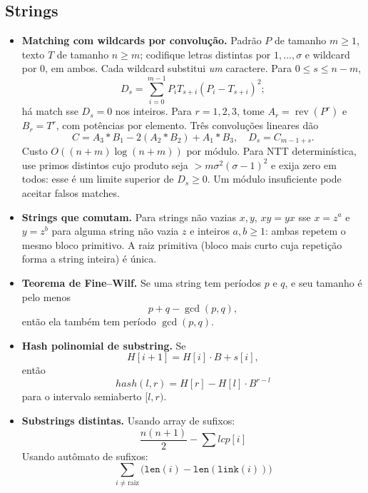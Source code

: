 
\subsection{Strings}
\begin{itemize}[leftmargin=*,label={}]
\item \textbf{Matching com wildcards por convolução.}
Padrão $P$ de tamanho $m\ge1$, texto $T$ de tamanho $n\ge m$; codifique letras distintas por $1,\ldots,\sigma$ e wildcard por 0, em ambos. Cada wildcard substitui \emph{um} caractere. Para $0\le s\le n-m$,
\[
D_s=\sum_{i=0}^{m-1}P_iT_{s+i}(P_i-T_{s+i})^2;
\]
há match sse $D_s=0$ nos inteiros. Para $r=1,2,3$, tome $A_r=\operatorname{rev}(P^r)$ e $B_r=T^r$, com potências por elemento. Três convoluções lineares dão
\[
C=A_3*B_1-2(A_2*B_2)+A_1*B_3,\quad D_s=C_{m-1+s}.
\]
Custo $O((n+m)\log(n+m))$ por módulo. Para NTT determinística, use primos distintos cujo produto seja $>m\sigma^2(\sigma-1)^2$ e exija zero em todos: esse é um limite superior de $D_s\ge0$. Um módulo insuficiente pode aceitar falsos matches.

\ifextended
\item \textbf{Strings que comutam.}
Para strings não vazias $x,y$, $xy=yx$ sse $x=z^a$ e $y=z^b$ para alguma string não vazia $z$ e inteiros $a,b\ge1$: ambas repetem o mesmo bloco primitivo. A raiz primitiva (bloco mais curto cuja repetição forma a string inteira) é única.
\fi

	\item \textbf{Teorema de Fine--Wilf.}
		Se uma string tem períodos $p$ e $q$, e seu tamanho é pelo menos
		\[
			p+q-\gcd(p,q),
		\]
		então ela também tem período $\gcd(p,q)$.

		\ifextended
	\item \textbf{Hash polinomial de substring.}
		Se
		\[
			H[i+1]=H[i]\cdot B+s[i],
		\]
		então
		\[
			hash(l,r)=H[r]-H[l]\cdot B^{r-l}
		\]
		para o intervalo semiaberto $[l,r)$.
		\fi

	\item \textbf{Substrings distintas.}
		Usando array de sufixos:
		\[
			\frac{n(n+1)}{2} - \sum lcp[i]
		\]
		Usando autômato de sufixos:
		\[
			\sum_{i\ne\mathrm{raiz}} \bigl(\mathtt{len}(i)-\mathtt{len}(\mathtt{link}(i))\bigr)
		\]


\end{itemize}
